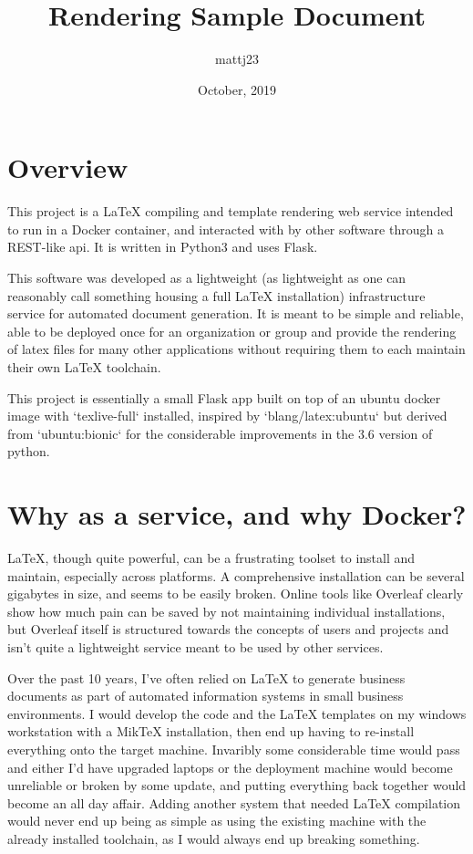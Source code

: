 \documentclass{notarealarticle}
\title{Rendering Sample Document}
\author{mattj23}
\date{October, 2019}
\begin{document}
\maketitle

\section{Overview}
This project is a LaTeX compiling and template rendering web service intended to run in a Docker container, and interacted with by other software through a REST-like api. It is written in Python3 and uses Flask.

This software was developed as a lightweight (as lightweight as one can reasonably call something housing a full LaTeX installation) infrastructure service for automated document generation. It is meant to be simple and reliable, able to be deployed once for an organization or group and provide the rendering of latex files for many other applications without requiring them to each maintain their own LaTeX toolchain.

This project is essentially a small Flask app built on top of an ubuntu docker image with `texlive-full` installed, inspired by `blang/latex:ubuntu` but derived from `ubuntu:bionic` for the considerable improvements in the 3.6 version of python.

\section{Why as a service, and why Docker?}
LaTeX, though quite powerful, can be a frustrating toolset to install and maintain, especially across platforms. A comprehensive installation can be several gigabytes in size, and seems to be easily broken.  Online tools like Overleaf clearly show how much pain can be saved by not maintaining individual installations, but Overleaf itself is structured towards the concepts of users and projects and isn't quite a lightweight service meant to be used by other services.

Over the past 10 years, I've often relied on LaTeX to generate business documents as part of automated information systems in small business environments.  I would develop the code and the LaTeX templates on my windows workstation with a MikTeX installation, then end up having to re-install everything onto the target machine.  Invaribly some considerable time would pass and either I'd have upgraded laptops or the deployment machine would become unreliable or broken by some update, and putting everything back together would become an all day affair.  Adding another system that needed LaTeX compilation would never end up being as simple as using the existing machine with the already installed toolchain, as I would always end up breaking something.
\end{document}
